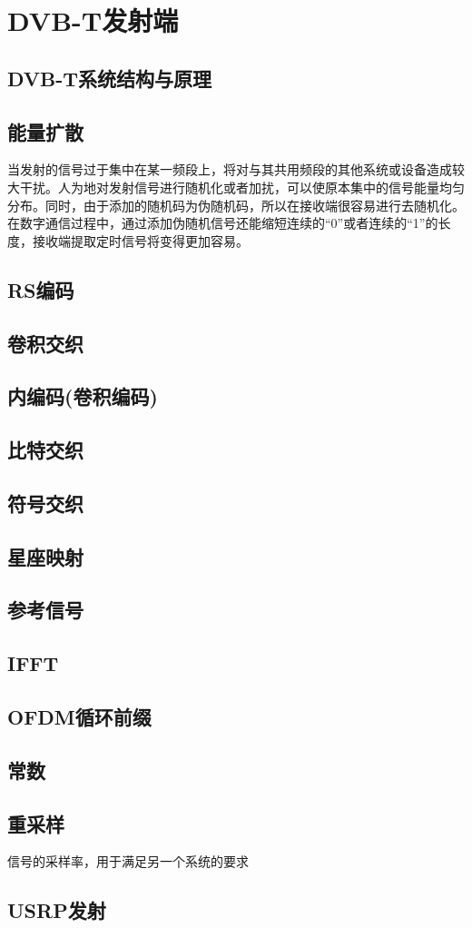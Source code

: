 \chapter{DVB-T发射端}
	\section{DVB-T系统结构与原理}
		
	\section{能量扩散}
		\par 当发射的信号过于集中在某一频段上，将对与其共用频段的其他系统或设备造成较大干扰。人为地对发射信号进行随机化或者加扰，可以使原本集中的信号能量均匀分布。同时，由于添加的随机码为伪随机码，所以在接收端很容易进行去随机化。在数字通信过程中，通过添加伪随机信号还能缩短连续的“0”或者连续的“1”的长度，接收端提取定时信号将变得更加容易。
	\section{RS编码}
	\section{卷积交织}
	\section{内编码(卷积编码)}
	\section{比特交织}
	\section{符号交织}
	\section{星座映射}
	\section{参考信号}
	\section{IFFT}
	\section{OFDM循环前缀}
	\section{常数}
	\section{重采样}
		信号的采样率，用于满足另一个系统的要求
	\section{USRP发射}
